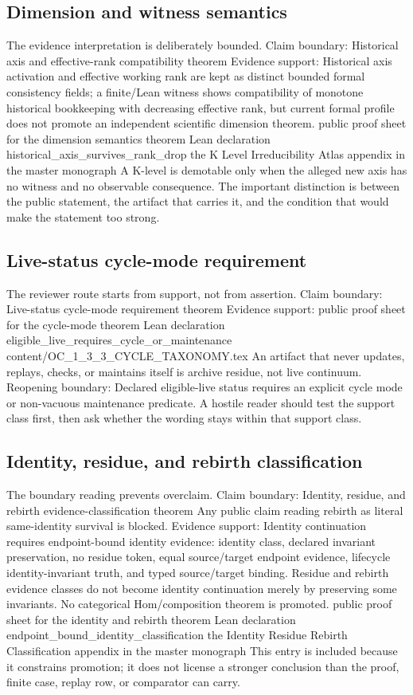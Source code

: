 \subsection{Dimension and witness semantics}
The evidence interpretation is deliberately bounded. Claim boundary: Historical axis and effective-rank compatibility theorem Evidence support: Historical axis activation and effective working rank are kept as distinct bounded formal consistency fields; a finite/Lean witness shows compatibility of monotone historical bookkeeping with decreasing effective rank, but current formal profile does not promote an independent scientific dimension theorem. public proof sheet for the dimension semantics theorem Lean declaration historical\_axis\_survives\_rank\_drop the K Level Irreducibility Atlas appendix in the master monograph A K-level is demotable only when the alleged new axis has no witness and no observable consequence. The important distinction is between the public statement, the artifact that carries it, and the condition that would make the statement too strong.

\subsection{Live-status cycle-mode requirement}
The reviewer route starts from support, not from assertion. Claim boundary: Live-status cycle-mode requirement theorem Evidence support: public proof sheet for the cycle-mode theorem Lean declaration eligible\_live\_requires\_cycle\_or\_maintenance content/OC\_1\_3\_3\_CYCLE\_TAXONOMY.tex An artifact that never updates, replays, checks, or maintains itself is archive residue, not live continuum. Reopening boundary: Declared eligible-live status requires an explicit cycle mode or non-vacuous maintenance predicate. A hostile reader should test the support class first, then ask whether the wording stays within that support class.

\subsection{Identity, residue, and rebirth classification}
The boundary reading prevents overclaim. Claim boundary: Identity, residue, and rebirth evidence-classification theorem Any public claim reading rebirth as literal same-identity survival is blocked. Evidence support: Identity continuation requires endpoint-bound identity evidence: identity class, declared invariant preservation, no residue token, equal source/target endpoint evidence, lifecycle identity-invariant truth, and typed source/target binding. Residue and rebirth evidence classes do not become identity continuation merely by preserving some invariants. No categorical Hom/composition theorem is promoted. public proof sheet for the identity and rebirth theorem Lean declaration endpoint\_bound\_identity\_classification the Identity Residue Rebirth Classification appendix in the master monograph This entry is included because it constrains promotion; it does not license a stronger conclusion than the proof, finite case, replay row, or comparator can carry.

